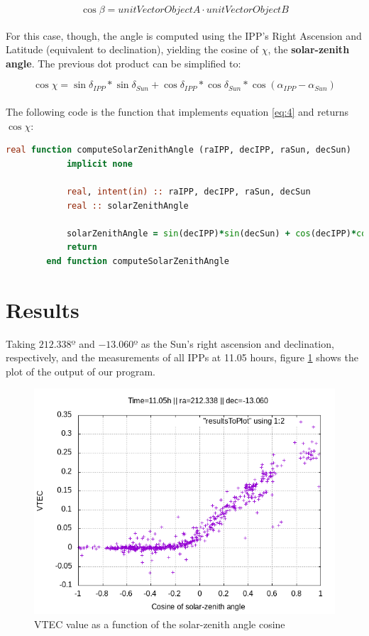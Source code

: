 \begin{equation} \label{eq:3}
\cos \beta = unitVectorObjectA \cdot unitVectorObjectB
\end{equation}\\

For this case, though, the angle is computed using the IPP's Right Ascension and Latitude (equivalent to declination), yielding the cosine of $\chi$, the \textbf{solar-zenith angle}. The previous dot product can be simplified to:

\begin{equation} \label{eq:4}
\cos \chi = \sin\delta_{IPP}*\sin\delta_{Sun} + \cos\delta_{IPP}*\cos\delta_{Sun}*\cos(\alpha_{IPP} - \alpha_{Sun})
\end{equation}\\

The following code is the function that implements equation \ref{eq:4} and returns $\cos \chi$:

\begin{lstlisting}[language=Fortran, caption=Computation of the solar-zenith a angle's cosine]
real function computeSolarZenithAngle (raIPP, decIPP, raSun, decSun)
			implicit none

			real, intent(in) :: raIPP, decIPP, raSun, decSun
			real :: solarZenithAngle
			
			solarZenithAngle = sin(decIPP)*sin(decSun) + cos(decIPP)*cos(decSun)*cos(raIPP - raSun)
			return
		end function computeSolarZenithAngle
\end{lstlisting}

\section{Results}

Taking $212.338º$ and $-13.060º$ as the Sun's right ascension and declination, respectively, and the measurements of all IPPs at 11.05 hours, figure \ref{fig:results} shows the plot of the output of our program.

\begin{figure}[!htb]
\begin{centering}
	\includegraphics[width=0.5\linewidth]{images/ch4/resultSunTest.png}
	\caption{VTEC value as a function of the solar-zenith angle cosine}
	\label{fig:results}
\end{centering}
\end{figure}

